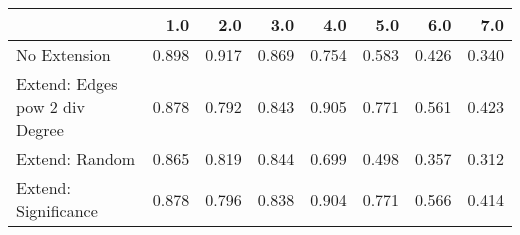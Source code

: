 \begin{tabular}{lrrrrrrr}
\toprule
{} &   1.0 &   2.0 &   3.0 &   4.0 &   5.0 &   6.0 &   7.0 \\
\midrule
No Extension                   & 0.898 & 0.917 & 0.869 & 0.754 & 0.583 & 0.426 & 0.340 \\
Extend: Edges pow 2 div Degree & 0.878 & 0.792 & 0.843 & 0.905 & 0.771 & 0.561 & 0.423 \\
Extend: Random                 & 0.865 & 0.819 & 0.844 & 0.699 & 0.498 & 0.357 & 0.312 \\
Extend: Significance           & 0.878 & 0.796 & 0.838 & 0.904 & 0.771 & 0.566 & 0.414 \\
\bottomrule
\end{tabular}
